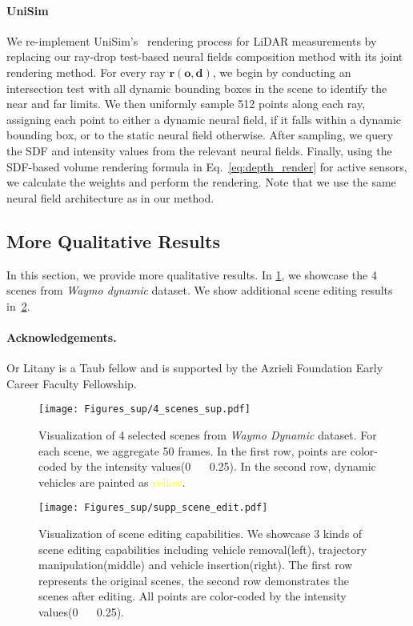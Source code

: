 \paragraph{UniSim} 
We re-implement UniSim's~\cite{yang2023unisim} rendering process for LiDAR measurements by replacing our ray-drop test-based neural fields composition method with its joint rendering method. For every ray $\mathbf{r} (\mathbf{o},\mathbf{d})$, we begin by conducting an intersection test with all dynamic bounding boxes in the scene to identify the near and far limits. We then uniformly sample 512 points along each ray, assigning each point to either a dynamic neural field, if it falls within a dynamic bounding box, or to the static neural field otherwise. After sampling, we query the SDF and intensity values from the relevant neural fields. Finally, using the SDF-based volume rendering formula in Eq.~\ref{eq:depth_render} for active sensors, we calculate the weights and perform the rendering. Note that we use the same neural field architecture as in our method.


\subsection{More Qualitative Results}
\label{sec:sup_visual}
In this section, we provide more qualitative results. In \cref{fig:4_scenes_supp}, we showcase the 4 scenes from \textit{Waymo dynamic} dataset. We show additional scene editing results in~\cref{fig:scene_editing_supp}. 

\paragraph{Acknowledgements.}
{Or Litany is a Taub fellow and is supported by the Azrieli Foundation Early Career Faculty Fellowship.}

\clearpage


\begin{figure}[t]
    \centering
     \texttt{[image: Figures\_sup/4\_scenes\_sup.pdf]}
     \caption{Visualization of 4 selected scenes from \textit{Waymo Dynamic} dataset. For each scene, we aggregate 50 frames. In the first row, points are color-coded by the intensity values(0 ~\bwrDyNFL~ 0.25). In the second row, dynamic vehicles are painted as \textcolor{yellow}{yellow}.}
     \label{fig:4_scenes_supp}
  \end{figure}
  
  \begin{figure}[t]
    \centering
     \texttt{[image: Figures\_sup/supp\_scene\_edit.pdf]}
     \caption{Visualization of scene editing capabilities. We showcase 3 kinds of scene editing capabilities including vehicle removal(left), trajectory manipulation(middle) and vehicle insertion(right). The first row represents the original scenes, the second row demonstrates the scenes after editing. All points are color-coded by the intensity values(0 ~\bwrDyNFL~ 0.25).}
     \label{fig:scene_editing_supp}
  \end{figure}


